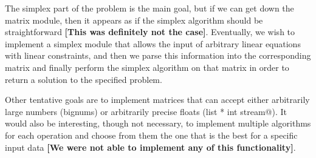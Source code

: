 \documentclass[letterpaper,11pt]{article}
\newcommand{\annot}[1]{\textbf{\color{BrickRed} [#1]}}
\begin{document}
The simplex part of the problem is the main goal, but if we can get down the
matrix module, then it appears as if the simplex algorithm should be
straightforward {\annot{This was definitely not the case}}. Eventually, we wish
to implement a simplex module that allows the input of arbitrary linear
equations with linear constraints, and then we parse this information into the
corresponding matrix and finally perform the simplex algorithm on that matrix in
order to return a solution to the specified problem.

Other tentative goals are to implement matrices that can accept either
arbitrarily large numbers (bignums) or arbitrarily precise floats 
(\verb@int list * int stream@). It would also be interesting, though not
necessary, to implement multiple algorithms for each operation and choose from
them the one that is the best for a specific input data {\annot{We were not able
to implement any of this functionality}}.
\end{document}
